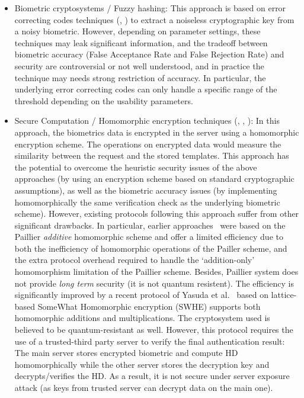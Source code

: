 \begin{itemize}
\item Biometric cryptosystems / Fuzzy hashing: This approach is based on error
    correcting codes techniques (\cite{uludag2004biometric}, \cite{nagar2010hybrid}) to extract a noiseless cryptographic key from a noisy biometric. However, depending on parameter settings, these techniques may leak significant information, and the tradeoff between biometric accuracy (False Acceptance Rate and False Rejection Rate) and security are
    controversial or not well understood, and in practice the technique may  needs strong restriction of accuracy. In particular, the underlying error
correcting codes can only handle a specific range of the threshold depending on the usability parameters.

\item Secure Computation / Homomorphic encryption techniques
    (\cite{yasuda2014practical}, \cite{shahandashti2012private},
    \cite{higo2015privacy}): In this approach, the biometrics data is encrypted
    in the server using a homomorphic encryption scheme. The operations on
    encrypted data would measure the similarity between the request and the
    stored templates. This approach has the potential to overcome the heuristic
    security issues of the above approaches (by using an encryption scheme based
    on standard cryptographic assumptions), as well as the biometric accuracy
    issues (by implementing homomorphically the same verification check as the
    underlying biometric scheme). However, existing protocols following this
    approach suffer from other significant drawbacks. In particular, earlier
    approaches~\cite{shahandashti2012private} were based on the Paillier
    \emph{additive} homomorphic scheme and offer a limited efficiency due to
    both the inefficiency of homomorphic operations of the Pailler scheme, and
    the extra protocol overhead required to handle the `addition-only'
    homomorphism limitation of the Paillier scheme. Besides, Paillier system
    does not provide \emph{long term} security (it is not quantum resistent).
    The efficiency is
    significantly improved by a recent protocol of Yasuda et
    al.~\cite{yasuda2014practical} based on lattice-based SomeWhat Homomorphic
    encryption (SWHE) supports both homomorphic additions and multiplications.
    The cryptosystem used is believed to be quantum-resistant as
    well.
    However, this protocol requires the use of a trusted-third party server to
    verify the final authentication result: The main server stores encrypted
    biometric and compute HD homomorphically while the other server stores the
    decryption key and decrypts/verifies the HD.
    As a result, it is not secure under
    server exposure attack (as keys from trusted server can decrypt data on the
    main one).
  \end{itemize}

